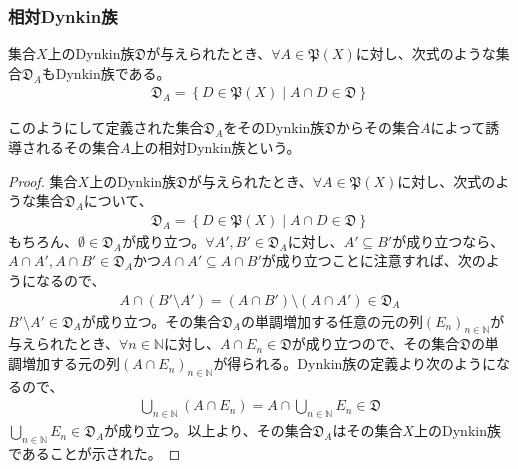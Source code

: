 \documentclass[dvipdfmx]{jsarticle}
\begin{document}
\subsubsection{相対Dynkin族}%
\begin{thm}\label{4.5.6.13}
集合$X$上のDynkin族$\mathfrak{D}$が与えられたとき、$\forall A \in \mathfrak{P}(X)$に対し、次式のような集合$\mathfrak{D}_{A}$もDynkin族である。
\begin{align*}
\mathfrak{D}_{A} = \left\{ D \in \mathfrak{P}(X) \middle| A \cap D \in \mathfrak{D} \right\}
\end{align*}
\end{thm}
\begin{dfn}
このようにして定義された集合$\mathfrak{D}_{A}$をそのDynkin族$\mathfrak{D}$からその集合$A$によって誘導されるその集合$A$上の相対Dynkin族という。
\end{dfn}
\begin{proof}
集合$X$上のDynkin族$\mathfrak{D}$が与えられたとき、$\forall A \in \mathfrak{P}(X)$に対し、次式のような集合$\mathfrak{D}_{A}$について、
\begin{align*}
\mathfrak{D}_{A} = \left\{ D \in \mathfrak{P}(X) \middle| A \cap D \in \mathfrak{D} \right\}
\end{align*}
もちろん、$\emptyset \in \mathfrak{D}_{A}$が成り立つ。$\forall A',B' \in \mathfrak{D}_{A}$に対し、$A' \subseteq B'$が成り立つなら、$A \cap A',A \cap B' \in \mathfrak{D}_{A}$かつ$A \cap A' \subseteq A \cap B'$が成り立つことに注意すれば、次のようになるので、
\begin{align*}
A \cap \left( B' \setminus A' \right) = \left( A \cap B' \right) \setminus \left( A \cap A' \right) \in \mathfrak{D}_{A}
\end{align*}
$B' \setminus A' \in \mathfrak{D}_{A}$が成り立つ。その集合$\mathfrak{D}_{A}$の単調増加する任意の元の列$\left( E_{n} \right)_{n \in \mathbb{N}}$が与えられたとき、$\forall n \in \mathbb{N}$に対し、$A \cap E_{n}\in \mathfrak{D}$が成り立つので、その集合$\mathfrak{D}$の単調増加する元の列$\left( A \cap E_{n} \right)_{n \in \mathbb{N}}$が得られる。Dynkin族の定義より次のようになるので、
\begin{align*}
\bigcup_{n \in \mathbb{N}} \left( A \cap E_{n} \right) = A \cap \bigcup_{n \in \mathbb{N}} E_{n}\in \mathfrak{D}
\end{align*}
$\bigcup_{n \in \mathbb{N}} E_{n} \in \mathfrak{D}_{A}$が成り立つ。以上より、その集合$\mathfrak{D}_{A}$はその集合$X$上のDynkin族であることが示された。
\end{proof}
\end{document}

